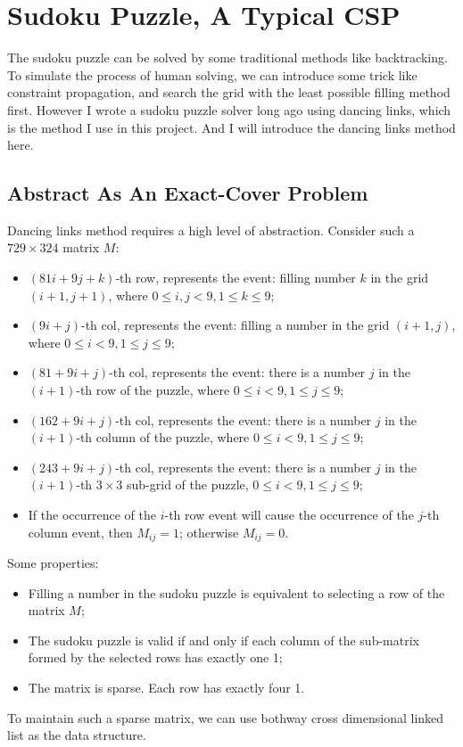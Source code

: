 \documentclass{article}
\begin{document}
\section{Sudoku Puzzle, A Typical CSP}
The sudoku puzzle can be solved by some traditional methods like backtracking. To simulate the process of human solving, we can introduce some trick like constraint propagation, and search the grid with the least possible filling method first. However I wrote a sudoku puzzle solver long ago using dancing links, which is the method I use in this project. And I will introduce the dancing links method here.
\subsection{Abstract As An Exact-Cover Problem}
Dancing links method requires a high level of abstraction. Consider such a $729\times324$ matrix $M$:
\begin{itemize}
    \item $(81i+9j+k)$-th row, represents the event: filling number $k$ in the grid $(i+1, j+1)$, where $0\leq i, j < 9, 1\leq k\leq 9$;
    \item $(9i+j)$-th col, represents the event: filling a number in the grid $(i+1, j)$, where $0\leq i<9, 1\leq j\leq 9$;
    \item $(81+9i+j)$-th col, represents the event: there is a number $j$ in the $(i+1)$-th row of the puzzle, where $0\leq i <9, 1\leq j\leq 9$;
    \item $(162+9i+j)$-th col, represents the event: there is a number $j$ in the $(i+1)$-th column of the puzzle, where $0\leq i <9, 1\leq j\leq 9$;
    \item $(243+9i+j)$-th col, represents the event: there is a number $j$ in the $(i+1)$-th $3\times3$ sub-grid of the puzzle, $0\leq i <9, 1\leq j\leq 9$;
    \item If the occurrence of the $i$-th row event will cause the occurrence of the $j$-th column event, then $M_{ij}=1$; otherwise $M_{ij}=0$.
\end{itemize}
Some properties:
\begin{itemize}
    \item Filling a number in the sudoku puzzle is equivalent to selecting a row of the matrix $M$;
    \item The sudoku puzzle is valid if and only if each column of the sub-matrix formed by the selected rows has exactly one 1;
    \item The matrix is sparse. Each row has exactly four 1.
\end{itemize}
To maintain such a sparse matrix, we can use bothway cross dimensional linked list as the data structure.
\end{document}
